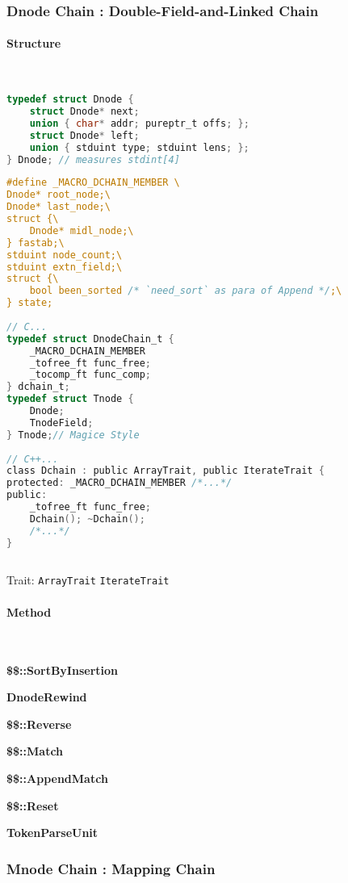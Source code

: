 \subsubsection{Dnode Chain : Double-Field-and-Linked Chain}

\paragraph{Structure} \

\lstset{style=GlobalC}
\begin{lstlisting}[language=C]
typedef struct Dnode {
	struct Dnode* next;
	union { char* addr; pureptr_t offs; };
	struct Dnode* left;
	union { stduint type; stduint lens; };
} Dnode; // measures stdint[4]
\end{lstlisting}

\lstset{style=GlobalC}
\begin{lstlisting}[language=C]
#define _MACRO_DCHAIN_MEMBER \
Dnode* root_node;\
Dnode* last_node;\
struct {\
	Dnode* midl_node;\
} fastab;\
stduint node_count;\
stduint extn_field;\
struct {\
	bool been_sorted /* `need_sort` as para of Append */;\
} state;
	
// C...
typedef struct DnodeChain_t {
	_MACRO_DCHAIN_MEMBER
	_tofree_ft func_free;
	_tocomp_ft func_comp;
} dchain_t;
typedef struct Tnode {
	Dnode;
	TnodeField;
} Tnode;// Magice Style
	
// C++...
class Dchain : public ArrayTrait, public IterateTrait {
protected: _MACRO_DCHAIN_MEMBER /*...*/
public:
	_tofree_ft func_free;
	Dchain(); ~Dchain();
	/*...*/
}
	
\end{lstlisting}

Trait:  \verb|ArrayTrait| \verb|IterateTrait|

\paragraph{Method} \

\textbf{\$\$::SortByInsertion}

\textbf{DnodeRewind}

\textbf{\$\$::Reverse}

\textbf{\$\$::Match}

\textbf{\$\$::AppendMatch}

\textbf{\$\$::Reset}

\textbf{TokenParseUnit}

\subsubsection{Mnode Chain : Mapping Chain}

